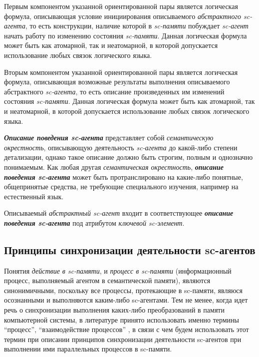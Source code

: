 Первым компонентом указанной ориентированной пары является логическая формула, описывающая условие инициирования описываемого \textit{абстрактного sc-агента}, то есть конструкции, наличие которой в \textit{sc-памяти} побуждает \textit{sc-агент} начать работу по изменению состояния \textit{sc-памяти}. Данная логическая формула может быть как атомарной, так и неатомарной, в которой допускается использование любых связок логического языка.

Вторым компонентом указанной ориентированной пары является логическая формула, описывающая возможные результаты выполнения описываемого абстрактного \textit{sc-агента}, то есть описание произведенных им изменений состояния \textit{sc-памяти}. Данная логическая формула может быть как атомарной, так и неатомарной, в которой допускается использование любых связок логического языка.

\begin{SCn}
\end{SCn}

\textbf{\textit{Описание поведения sc-агента}} представляет собой \textit{семантическую окрестность}, описывающую деятельность \textit{sc-агента} до какой-либо степени детализации, однако такое описание должно быть строгим, полным и однозначно понимаемым. Как любая другая \textit{семантическая окрестность}, \textbf{\textit{описание поведения sc-агента}} может быть протранслировано на какие-либо понятные, общепринятые средства, не требующие специального изучения, например на естественный язык.

Описываемый \textit{абстрактный sc-агент} входит в соответствующее \textbf{\textit{описание поведения sc-агента}} под атрибутом \textit{ключевой sc-элемент\scnrolesign}.

\subsection{Принципы синхронизации деятельности sc-агентов}

Понятия \textit{действие в sc-памяти}, и \textit{процесс в sc-памяти} (информационный процесс, выполняемый агентом в семантической памяти), являются синонимичными, поскольку все процессы, протекающие в sc-памяти, являюся осознанными и выполняются каким-либо sc-агентами. Тем не менее, когда идет речь о синхронизации выполнения каких-либо преобразований в памяти компьютерной системы, в литературе принято использовать именно термины ``процесс'', ``взаимодействие процессов'' \cite{Dijkstra1972,Hoare1989}, в связи с чем будем использовать этот термин при описании принципов синхронизации деятельности sc-агентов при выполнении ими параллельных процессов в sc-памяти.


